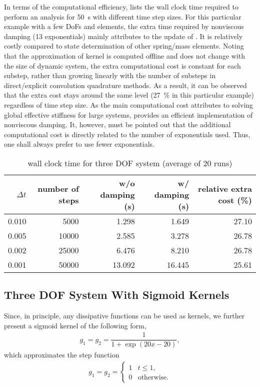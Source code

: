 In terms of the computational efficiency,  lists the wall clock time required to perform an analysis for \SI{50}{\second} with different time step sizes.
For this particular example with a few DoFs and elements, the extra time required by nonviscous damping (\num{13} exponentials) mainly attributes to the update of .
It is relatively costly compared to state determination of other spring/mass elements.
Noting that the approximation of kernel is computed offline and does not change with the size of dynamic system, the extra computational cost is constant for each substep, rather than growing linearly with the number of substeps in direct/explicit convolution quadrature methods.
As a result, it can be observed that the extra cost stays around the same level (\SI{27}{\percent} in this particular example) regardless of time step size.
As the main computational cost attributes to solving global effective stiffness for large systems,  provides an efficient implementation of nonviscous damping.
It, however, must be pointed out that the additional computational cost is directly related to the number of exponentials used. Thus, one shall always prefer to use fewer exponentials.
\begin{table}[H]
\centering\footnotesize
\caption{wall clock time for three DOF system (average of \num{20} runs)}\label{tab:three_cost}
\begin{tabular}{rrrrr}
    \toprule
    $\Delta{}t$ & number of steps & w/o damping (\si{\second}) & w/ damping (\si{\second}) & relative extra cost (\%) \\ \midrule
    \num{0.010} &      \num{5000} &                \num{1.298} &               \num{1.649} &              \num{27.10} \\
    \num{0.005} &     \num{10000} &                \num{2.585} &               \num{3.278} &              \num{26.78} \\
    \num{0.002} &     \num{25000} &                \num{6.476} &               \num{8.210} &              \num{26.78} \\
    \num{0.001} &     \num{50000} &               \num{13.092} &              \num{16.445} &              \num{25.61} \\ \bottomrule
\end{tabular}
\end{table}
\subsection{Three DOF System With Sigmoid Kernels}
Since, in principle, any dissipative functions can be used as kernels, we further present a sigmoid kernel of the following form,
\begin{gather}
g_1=g_2=\dfrac{1}{1+\exp\left(20x-20\right)},
\end{gather}
which approximates the step function
\begin{gather}
g_1=g_2=\left\{
\begin{array}{ll}
1&t\leqslant1,\\
0&\text{otherwise.}
\end{array}
\right.
\end{gather}

